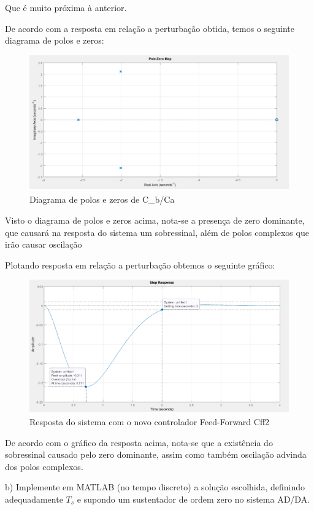 \documentclass[a4paper,12pt]{article}
\begin{document}
Que é muito próxima à anterior.

De acordo com a resposta em relação a perturbação obtida, temos o seguinte diagrama de polos e zeros:

\begin{figure} [H]
    \centering
    \includegraphics[width=0.8\linewidth]{image22.png}
    \caption{Diagrama de polos e zeros de C_b/Ca}
    
\end{figure}

Visto o diagrama de polos e zeros acima, nota-se a presença de zero dominante, que causará na resposta do sistema um sobressinal, além de polos complexos que irão causar oscilação

Plotando resposta em relação a perturbação obtemos o seguinte gráfico:

\begin{figure} [H]
    \centering
    \includegraphics[width=0.8\linewidth]{image23.png}
    \caption{Resposta do sistema com o novo controlador Feed-Forward Cff2}
    
\end{figure}

De acordo com o gráfico da resposta acima, nota-se que a existência do sobressinal causado pelo zero dominante, assim como também oscilação advinda dos polos complexos.


b) Implemente em MATLAB (no tempo discreto) a solução escolhida, definindo adequadamente \(T_s\) e supondo um sustentador de ordem zero no sistema AD/DA.
\end{document}
